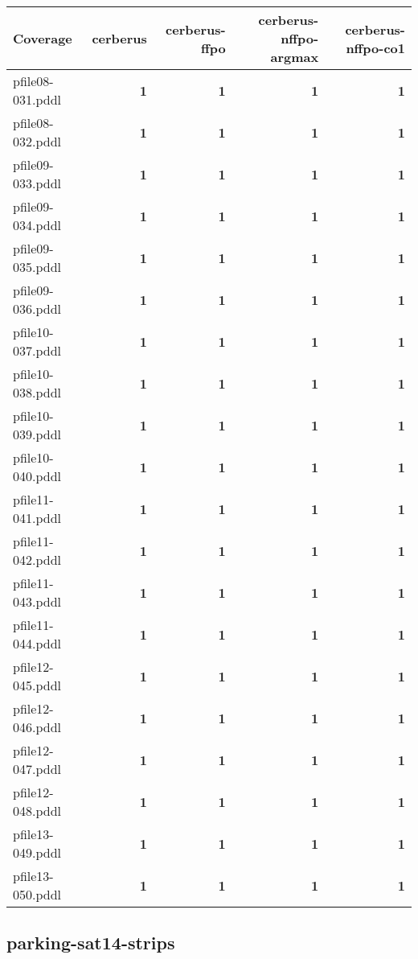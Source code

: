 \documentclass{article}
\begin{document}
\begin{tabular}{@{}lrrrr@{}}
Coverage & cerberus & cerberus-ffpo & cerberus-nffpo-argmax & cerberus-nffpo-co1 \\
\midrule
pfile08-031.pddl & \textbf{1} & \textbf{1} & \textbf{1} & \textbf{1} \\
pfile08-032.pddl & \textbf{1} & \textbf{1} & \textbf{1} & \textbf{1} \\
pfile09-033.pddl & \textbf{1} & \textbf{1} & \textbf{1} & \textbf{1} \\
pfile09-034.pddl & \textbf{1} & \textbf{1} & \textbf{1} & \textbf{1} \\
pfile09-035.pddl & \textbf{1} & \textbf{1} & \textbf{1} & \textbf{1} \\
pfile09-036.pddl & \textbf{1} & \textbf{1} & \textbf{1} & \textbf{1} \\
pfile10-037.pddl & \textbf{1} & \textbf{1} & \textbf{1} & \textbf{1} \\
pfile10-038.pddl & \textbf{1} & \textbf{1} & \textbf{1} & \textbf{1} \\
pfile10-039.pddl & \textbf{1} & \textbf{1} & \textbf{1} & \textbf{1} \\
pfile10-040.pddl & \textbf{1} & \textbf{1} & \textbf{1} & \textbf{1} \\
pfile11-041.pddl & \textbf{1} & \textbf{1} & \textbf{1} & \textbf{1} \\
pfile11-042.pddl & \textbf{1} & \textbf{1} & \textbf{1} & \textbf{1} \\
pfile11-043.pddl & \textbf{1} & \textbf{1} & \textbf{1} & \textbf{1} \\
pfile11-044.pddl & \textbf{1} & \textbf{1} & \textbf{1} & \textbf{1} \\
pfile12-045.pddl & \textbf{1} & \textbf{1} & \textbf{1} & \textbf{1} \\
pfile12-046.pddl & \textbf{1} & \textbf{1} & \textbf{1} & \textbf{1} \\
pfile12-047.pddl & \textbf{1} & \textbf{1} & \textbf{1} & \textbf{1} \\
pfile12-048.pddl & \textbf{1} & \textbf{1} & \textbf{1} & \textbf{1} \\
pfile13-049.pddl & \textbf{1} & \textbf{1} & \textbf{1} & \textbf{1} \\
pfile13-050.pddl & \textbf{1} & \textbf{1} & \textbf{1} & \textbf{1} \\
\end{tabular}

\hypertarget{coverage-parking-sat14-strips}{}
\subsection*{parking-sat14-strips}
\end{document}
